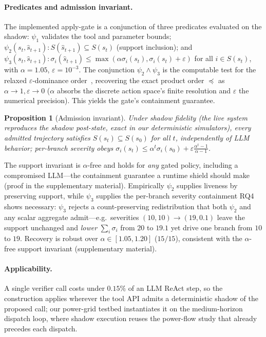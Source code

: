 \documentclass[letterpaper]{article} %
\theoremstyle{plain}
\newtheorem{proposition}{Proposition}
\newcommand{\psione}{\psi_1}
\newcommand{\psitwo}{\psi_2}
\newcommand{\psithree}{\psi_3}
\begin{document}
\paragraph{Predicates and admission invariant.}
The implemented apply-gate is a conjunction of three predicates evaluated on the shadow: $\psione$ validates the tool and parameter bounds; $\psitwo(s_t,\hat{s}_{t+1}): S(\hat{s}_{t+1})\subseteq S(s_t)$ (support inclusion); and $\psithree(s_t,\hat{s}_{t+1}): \sigma_i(\hat{s}_{t+1})\le\max(\alpha\sigma_i(s_t),\sigma_i(s_t)+\varepsilon)$ for all $i\in S(s_t)$, with $\alpha{=}1.05$, $\varepsilon{=}10^{-3}$. The conjunction $\psitwo\wedge\psithree$ is the computable test for the relaxed $\varepsilon$-dominance order~\citep{laumanns2002}, recovering the exact product order $\preceq$ as $\alpha\to1,\varepsilon\to0$ ($\alpha$ absorbs the discrete action space's finite resolution and $\varepsilon$ the numerical precision). This yields the gate's containment guarantee.
\begin{proposition}[Admission invariant]
\label{prop:inv}
Under shadow fidelity (the live system reproduces the shadow post-state, exact in our deterministic simulators), every admitted trajectory satisfies $S(s_t)\subseteq S(s_0)$ for all $t$, independently of LLM behavior; per-branch severity obeys $\sigma_i(s_t)\le\alpha^{t}\sigma_i(s_0)+\varepsilon\tfrac{\alpha^{t}-1}{\alpha-1}$.
\end{proposition}
\noindent The support invariant is $\alpha$-free and holds for \emph{any} gated policy, including a compromised LLM---the containment guarantee a runtime shield should make (proof in the supplementary material). Empirically $\psitwo$ supplies liveness by preserving support, while $\psithree$ supplies the per-branch severity containment RQ4 shows necessary: $\psithree$ rejects a count-preserving redistribution that both $\psitwo$ and any scalar aggregate admit---e.g.\ severities $(10,10)\!\to\!(19,0.1)$ leave the support unchanged and \emph{lower} $\sum_i\sigma_i$ from $20$ to $19.1$ yet drive one branch from $10$ to $19$. Recovery is robust over $\alpha\in[1.05,1.20]$ ($15/15$), consistent with the $\alpha$-free support invariant (supplementary material).

\paragraph{Applicability.}
A single verifier call costs under $0.15\%$ of an LLM ReAct step, so the construction applies wherever the tool API admits a deterministic shadow of the proposed call; our power-grid testbed instantiates it on the medium-horizon dispatch loop, where shadow execution reuses the power-flow study that already precedes each dispatch.
\end{document}
